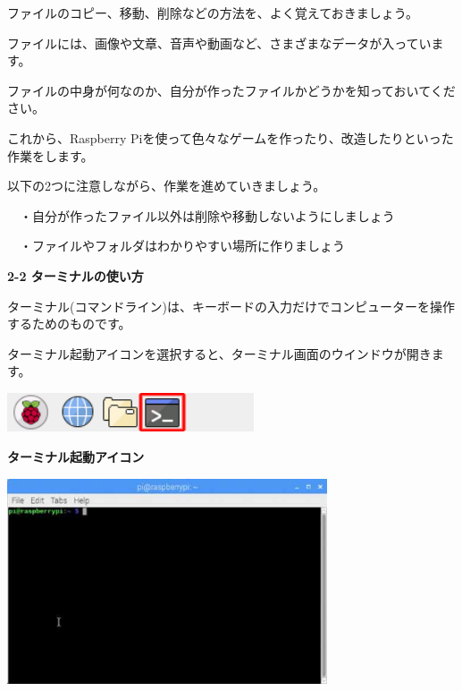 \documentclass[a4paper,dvipdfmx]{jarticle}
\newcommand\textstyleqwerty[1]{#1}
\begin{document}
\bigskip


\bigskip


\bigskip

ファイルのコピー、移動、削除などの方法を、よく覚えておきましょう。

ファイルには、画像や文章、音声や動画など、さまざまなデータが入っています。

ファイルの中身が何なのか、自分が作ったファイルかどうかを知っておいてください。


\bigskip

これから、Raspberry
Piを使って色々なゲームを作ったり、改造したりといった作業をします。

以下の2つに注意しながら、作業を進めていきましょう。


\bigskip

\ \ ・自分が作ったファイル以外は削除や移動しないようにしましょう

\ \ ・ファイルやフォルダはわかりやすい場所に作りましょう


\bigskip

\clearpage
\textstyleqwerty{\textbf{2-2 ターミナルの使い方}}


\bigskip

ターミナル(コマンドライン)は、キーボードの入力だけでコンピューターを操作するためのものです。

ターミナル起動アイコンを選択すると、ターミナル画面のウインドウが開きます。



\begin{center}
\includegraphics[width=7.303cm,height=1.15cm]{text02-img/text02-img003.png}

\end{center}

\bigskip

\textstyleqwerty{\textbf{ターミナル起動アイコン}}


\bigskip


\bigskip



\begin{center}
\includegraphics[width=9.472cm,height=6.061cm]{text02-img/text02-img004.png}

\end{center}
\end{document}
